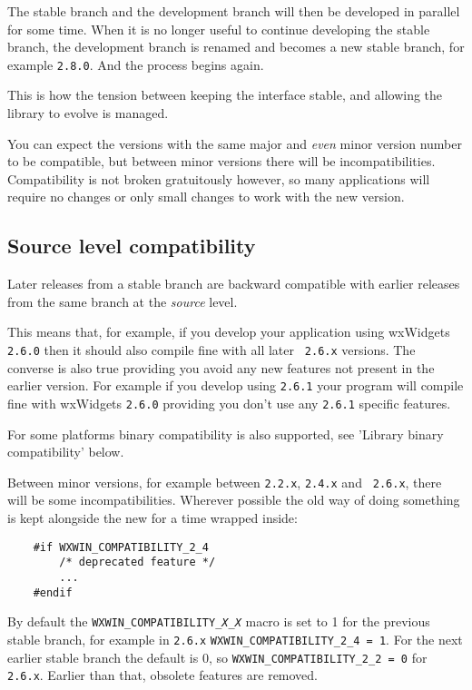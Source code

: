The stable branch and the development branch will then be developed in
parallel for some time. When it is no longer useful to continue developing
the stable branch, the development branch is renamed and becomes a new
stable branch, for example {\tt 2.8.0}. And the process begins again.

This is how the tension between keeping the interface stable, and allowing
the library to evolve is managed.

You can expect the versions with the same major and {\em even} minor
version number to be compatible, but between minor versions there will be
incompatibilities. Compatibility is not broken gratuitously however, so
many applications will require no changes or only small changes to work
with the new version.

\subsection{Source level compatibility}\label{sourcecompatibility}

Later releases from a stable branch are backward compatible with earlier
releases from the same branch at the {\em source} level.

This means that, for example, if you develop your application using
wxWidgets {\tt 2.6.0} then it should also compile fine with all later {\tt
2.6.x} versions. The converse is also true providing you avoid any new
features not present in the earlier version. For example if you develop
using {\tt 2.6.1} your program will compile fine with wxWidgets {\tt 2.6.0}
providing you don't use any {\tt 2.6.1} specific features.

For some platforms binary compatibility is also supported, see 'Library
binary compatibility' below.

Between minor versions, for example between {\tt 2.2.x}, {\tt 2.4.x} and {\tt
2.6.x}, there will be some incompatibilities. Wherever possible the old way
of doing something is kept alongside the new for a time wrapped inside:

\begin{verbatim}
    #if WXWIN_COMPATIBILITY_2_4
        /* deprecated feature */
        ...
    #endif
\end{verbatim}

By default the {\tt WXWIN\_COMPATIBILITY{\it \_X\_X}} macro is set
to 1 for the previous stable branch, for example
in {\tt 2.6.x} {\tt WXWIN\_COMPATIBILITY\_2\_4 = 1}. For the next earlier
stable branch the default is 0, so {\tt WXWIN\_COMPATIBILITY\_2\_2 = 0}
for {\tt 2.6.x}. Earlier than that, obsolete features are removed.

